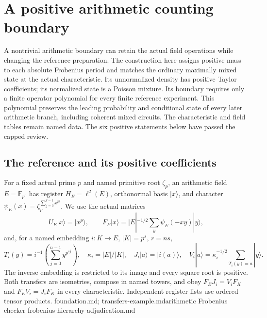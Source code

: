 \section{A positive arithmetic counting boundary}
\label{sec:positive-arithmetic-reference}

A nontrivial arithmetic boundary can retain the actual field operations
while changing the reference preparation. The construction here assigns
positive mass to each absolute Frobenius period and matches the ordinary
maximally mixed state at the actual characteristic. Its unnormalized density
has positive Taylor coefficients; its normalized state is a Poisson mixture. Its boundary requires only a finite operator polynomial for
every finite reference experiment. This polynomial preserves the leading
probability and conditional state of every later arithmetic branch, including
coherent mixed circuits. The characteristic and field tables remain named
data. The six positive statements below have passed the capped review.

\subsection{The reference and its positive coefficients}

For a fixed actual prime $p$ and named primitive root $\zeta_p$, an
arithmetic field $E=\mathbb F_{p^r}$ has register $H_E=\ell^2(E)$,
orthonormal basis $|x\rangle$, and character
$\psi_E(x)=\zeta_p^{\sum_{j=0}^{r-1}x^{p^j}}$. We use the actual matrices
\[
 U_E|x\rangle=|x^p\rangle,\qquad
 F_E|x\rangle=|E|^{-1/2}\sum_y\psi_E(-xy)|y\rangle,
\]
and, for a named embedding $i:K\to E$, $|K|=p^s$, $r=ns$,
\[
 T_i(y)=i^{-1}\!\left(\sum_{j=0}^{n-1}y^{p^{sj}}\right),\quad
 \kappa_i=|E|/|K|,\quad J_i|a\rangle=|i(a)\rangle,\quad
 V_i|a\rangle=\kappa_i^{-1/2}\sum_{T_i(y)=a}|y\rangle.
\]
The inverse embedding is restricted to its image and every square root is
positive. Both transfers are isometries, compose in named towers, and obey
$F_EJ_i=V_iF_K$ and $F_EV_i=J_iF_K$ in every characteristic.
Independent register lists use ordered tensor products.
{foundation.md; transfers-example.md}{arithmetic Frobenius checker}
{frobenius-hierarchy-adjudication.md}

